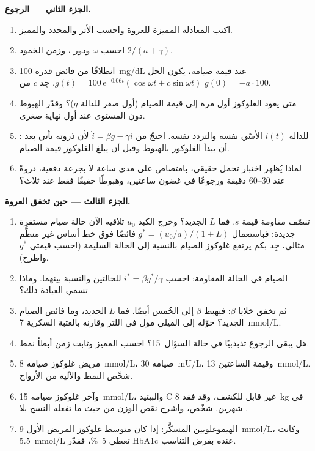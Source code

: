 \begin{problem}
\medskip
\noindent\textbf{الجزء الثاني --- الرجوع.}
\begin{enumerate}[resume]
  \item اكتب المعادلة المميزة للعروة واحسب الأثر والمحدد
        والمميز.
  \item احسب $\omega$ ودور ، وزمن الخمود
        $2/(a + \gamma)$.
  \item انطلاقًا من فائض قدره \qty{100}{mg/dL}  عند
        قيمة صيامه، يكون الحل $g(t) = 100\,\mathrm{e}^{-0.06t}
        (\cos\omega t + c\sin\omega t)$. جِد $c$ من $\dot g(0) = -a\cdot
        100$.
  \item متى يعود الغلوكوز أول مرة إلى قيمة الصيام (أول صفر
        للدالة $g$)؟ وقدّر الهبوط دون المستوى عند أول نهاية
        صغرى.
  \item {}: للدالة $i(t)$ الأسّي نفسه والتردد نفسه.
        احتجّ من $\dot i = \beta g - \gamma i$ لأن ذروته تأتي
        بعد أن يبدأ الغلوكوز بالهبوط وقبل أن يبلغ الغلوكوز
        قيمة الصيام.
  \item لماذا يُظهر اختبار تحمل حقيقي، بامتصاص على مدى ساعة
        لا بجرعة دفعية، ذروةً عند 30--60 دقيقة ورجوعًا في
        غضون ساعتين، وهبوطًا خفيفًا فقط عند ثلاث؟
\end{enumerate}

\medskip
\noindent\textbf{الجزء الثالث --- حين تخفق العروة.}
\begin{enumerate}[resume]
  \item تنصّف مقاومة  قيمة $s$. فما $L$ الجديد؟
        وخرج الكبد $u_{0}$ تلاقيه الآن حالة صيام مستقرة
        جديدة: فباستعمال $g^{*} = (u_{0}/a)/(1
        + L)$ فائضًا فوق خط أساس غير منظَّم مثالي، جِد بكم
        يرتفع غلوكوز الصيام بالنسبة إلى الحالة السليمة (احسب
        قيمتي $g^{*}$ واطرح).
  \item {} الصيام في الحالة المقاومة: احسب $i^{*} = \beta
        g^{*}/\gamma$ للحالتين والنسبة بينهما. وماذا تسمي
        العيادة ذلك؟
  \item ثم تخفق خلايا $\beta$: فيهبط $\beta$ إلى الخُمس أيضًا.
        فما $L$ الجديد، وما فائض الصيام الجديد؟ حوّله إلى الميلي
        مول في اللتر وقارنه بالعتبة السكرية \qty{7}{mmol/L}.
  \item هل يبقى الرجوع تذبذبيًا في حالة السؤال~15؟ احسب
        المميز وثابت زمن أبطأ نمط.
  \item مريض غلوكوز صيامه \qty{8}{mmol/L}،  صيامه
        \qty{30}{mU/L}، وقيمة الساعتين \qty{13}{mmol/L}. شخّص
        النمط والآلية من الأزواج.
  \item وآخر غلوكوز صيامه \qty{15}{mmol/L}، والببتيد C غير
        قابل للكشف، وقد فقد \qty{8}{kg} في شهرين. شخّص، واشرح
        نقص الوزن من حيث ما تفعله النسج بلا .
  \item الهيموغلوبين المسكَّر: إذا كان متوسط غلوكوز المريض
        الأول \qty{9}{mmol/L}، وكانت \qty{5.5}{mmol/L} تعطي
        \qty{5}{\%}، فقدّر HbA1c عنده بفرض التناسب.
\end{enumerate}


\end{problem}
